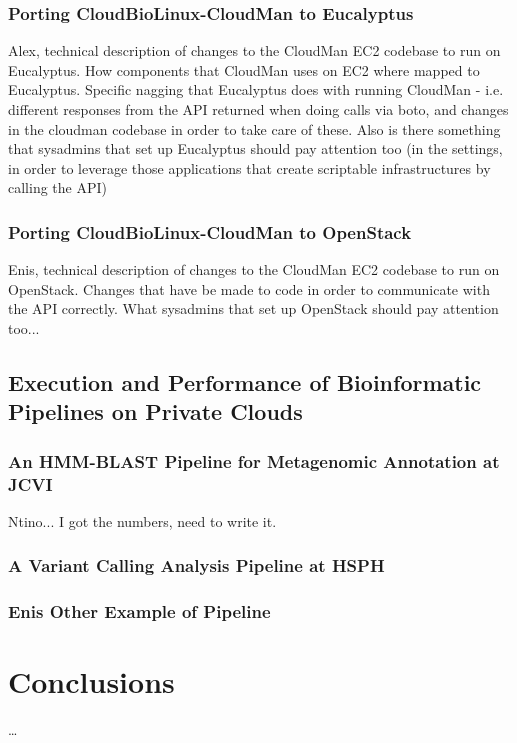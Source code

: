 \documentclass[10pt]{bmc_article}
\newenvironment{bmcformat}{\baselineskip20pt\sloppy\setboolean{publ}{false}}{\baselineskip20pt\sloppy}
\begin{document}
\begin{bmcformat}
\subsubsection*{Porting CloudBioLinux-CloudMan to Eucalyptus}
Alex, technical description of changes to the CloudMan EC2 codebase to run on Eucalyptus. How components that
CloudMan uses on EC2 where mapped to Eucalyptus. Specific nagging that Eucalyptus does with running CloudMan -
i.e. different responses from the API returned when doing calls via boto, and changes in the cloudman codebase in
order to take care of these. Also is there something that sysadmins that set up Eucalyptus should pay attention too 
(in the settings, in order to leverage those applications that create scriptable infrastructures by calling the API) \pb

\subsubsection*{Porting CloudBioLinux-CloudMan to OpenStack}
Enis, technical description of changes to the CloudMan EC2 codebase to run on OpenStack.  Changes that have be
made to code in order to communicate with the API correctly. What sysadmins that set up OpenStack should pay attention 
too... \pb

\subsection*{Execution and Performance of Bioinformatic Pipelines on Private Clouds} 

\subsubsection*{An HMM-BLAST Pipeline for Metagenomic Annotation at JCVI}
Ntino... I got the numbers, need to write it. \pb

\subsubsection*{A Variant Calling Analysis Pipeline at HSPH}
\pb

\subsubsection*{Enis Other Example of Pipeline}
\pb

\section*{Conclusions}  \ldots



\end{bmcformat}
\end{document}
